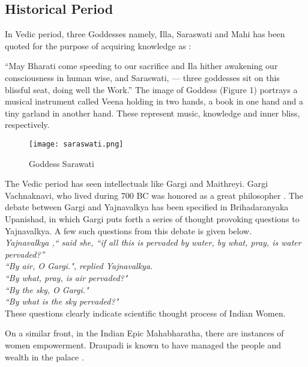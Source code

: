 \documentclass[a4paper,10pt]{article}
\begin{document}
\subsection{Historical Period}
In Vedic period, three Goddesses namely, Illa, Saraswati and Mahi has been quoted for the purpose of acquiring knowledge as \cite{saras}: 

“May Bharati come speeding to our sacrifice and Ila hither awakening our consciousness in human wise, and Saraswati, — three goddesses sit on this blissful seat, doing well the
Work.” 
The image of Goddess (Figure 1) portrays a musical instrument called Veena holding in  two hands, a book in one hand and a tiny garland in another hand. These represent music, knowledge and inner bliss, respectively. 
\begin{center}
\begin{figure}[h]
\centering
 \texttt{[image: saraswati.png]}
 \caption{Goddess Sarawati}
\end{figure}
\end{center}

The Vedic period has seen intellectuals like Gargi and Maithreyi. Gargi Vachnaknavi, who lived during 700 BC was honored as a great philosopher \cite{Gargi}. The debate between Gargi and Yajnavalkya has been specified in Brihadaranyaka Upanishad, in which Gargi puts forth a series of thought provoking questions to Yajnavalkya. A few such questions from this debate is given below. \\


\textit{Yajnavalkya ,`` said she, ``if all this is pervaded by water, by  what, pray, is water pervaded?''} \\
\textit{``By air, O Gargi.", replied Yajnavalkya.} \\
\textit{``By what, pray, is air pervaded?" }\\
\textit{``By the sky, O Gargi."} \\
\textit{``By what is the sky pervaded?"}  \\

These questions clearly indicate scientific thought process of Indian Women. 

On a similar front, in the Indian Epic Mahabharatha, there are instances of women empowerment. Draupadi is known to have managed the people and wealth in the palace \cite{mahabharatha}. 
\end{document}
